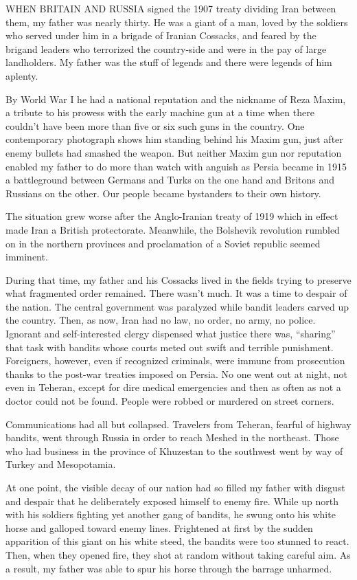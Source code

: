 WHEN BRITAIN AND RUSSIA signed the 1907 treaty dividing Iran between them, my father was nearly thirty. He was a giant of a man, loved by the soldiers who served under him in a brigade of Iranian Cossacks, and feared by the brigand leaders who terrorized the country-side and were in the pay of large landholders. My father was the stuff of legends and there were legends of him aplenty. 

By World War I he had a national reputation and the nickname of Reza Maxim, a tribute to his prowess with the early machine gun at a time when there couldn't have been more than five or six such guns in the country. One contemporary photograph shows him standing behind his Maxim gun, just after enemy bullets had smashed the weapon. But neither Maxim gun nor reputation enabled my father to do more than watch with anguish as Persia became in 1915 a battleground between Germans and Turks on the one hand and Britons and Russians on the other. Our people became bystanders to their own history. 

The situation grew worse after the Anglo-Iranian treaty of 1919 which in effect made Iran a British protectorate. Meanwhile, the Bolshevik revolution rumbled on in the northern provinces and proclamation of a Soviet republic seemed imminent. 

During that time, my father and his Cossacks lived in the fields trying to preserve what fragmented order remained. There wasn't much. It was a time to despair of the nation. The central government was paralyzed while bandit leaders carved up the country. Then, as now, Iran had no law, no order, no army, no police. Ignorant and self-interested clergy dispensed what justice there was, “sharing” that task with bandits whose courts meted out swift and terrible punishment. Foreigners, however, even if recognized criminals, were immune from prosecution thanks to the post-war treaties imposed on Persia. No one went out at night, not even in Teheran, except for dire medical emergencies and then as often as not a doctor could not be found. People were robbed or murdered on street corners. 

Communications had all but collapsed. Travelers from Teheran, fearful of highway bandits, went through Russia in order to reach Meshed in the northeast. Those who had business in the province of Khuzestan to the southwest went by way of Turkey and Mesopotamia. 

At one point, the visible decay of our nation had so filled my father with disgust and despair that he deliberately exposed himself to enemy fire. While up north with his soldiers fighting yet another gang of bandits, he swung onto his white horse and galloped toward enemy lines. Frightened at first by the sudden apparition of this giant on his white steed, the bandits were too stunned to react. Then, when they opened fire, they shot at random without taking careful aim. As a result, my father was able to spur his horse through the barrage unharmed. 

